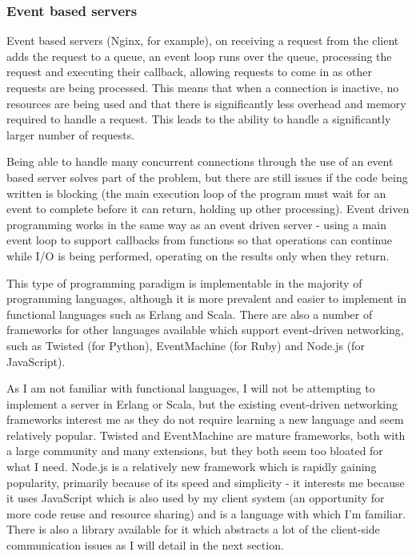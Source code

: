 \documentclass[a4papert,11pt,notitlepage]{ltxdoc}
\begin{document}
\subsubsection{Event based servers}
Event based servers (Nginx, for example), on receiving a request from the client adds the request to a queue, an event loop runs over the queue, processing the request and executing their callback, allowing requests to come in as other requests are being processed. This means that when a connection is inactive, no resources are being used and that there is significantly less overhead and memory required to handle a request. This leads to the ability to handle a significantly larger number of requests.

Being able to handle many concurrent connections through the use of an event based server solves part of the problem, but there are still issues if the code being written is blocking (the main execution loop of the program must wait for an event to complete before it can return, holding up other processing). Event driven programming works in the same way as an event driven server - using a main event loop to support callbacks from functions so that operations can continue while I/O is being performed, operating on the results only when they return.

This type of programming paradigm is implementable in the majority of programming languages, although it is more prevalent and easier to implement in functional languages such as Erlang and Scala. There are also a number of frameworks for other languages available which support event-driven networking, such as Twisted (for Python), EventMachine (for Ruby) and Node.js (for JavaScript). 

As I am not familiar with functional languages, I will not be attempting to implement a server in Erlang or Scala, but the existing event-driven networking frameworks interest me as they do not require learning a new language and seem relatively popular. Twisted and EventMachine are mature frameworks, both with a large community and many extensions, but they both seem too bloated for what I need. Node.js is a relatively new framework which is rapidly gaining popularity, primarily because of its speed and simplicity - it interests me because it uses JavaScript which is also used by my client system (an opportunity for more code reuse and resource sharing) and is a language with which I'm familiar. There is also a library available for it which abstracts a lot of the client-side communication issues as I will detail in the next section.
\end{document}

